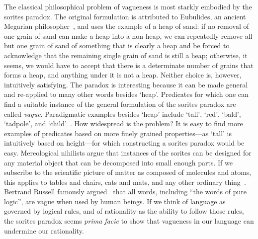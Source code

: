 \documentclass[a4paper]{article}
\begin{document}
The classical philosophical problem of vagueness is most starkly embodied by the sorites paradox.
The original formulation is attributed to Eubulides, an ancient Megarian philosopher~\parencite{sorensen_sorites_2009}, and uses the example of a heap of sand: if no removal of one grain of sand can make a heap into a non-heap, we can repeatedly remove all but one grain of sand of something that is clearly a heap and be forced to acknowledge that the remaining single grain of sand is still a heap; otherwise, it seems, we would have to accept that there is a determinate number of grains that forms a heap, and anything under it is not a heap.
Neither choice is, however, intuitively satisfying.
The paradox is interesting because it can be made general and re-applied to many other words besides `heap'.
Predicates for which one can find a suitable instance of the general formulation of the sorites paradox are called \emph{vague}.
Paradigmatic examples besides `heap' include `tall', `red', `bald', `tadpole', and `child'~\parencite{Keefe1997}.
How widespread is the problem?
It is easy to find more examples of predicates based on more finely grained properties---as `tall' is intuitively based on height---for which constructing a sorites paradox would be easy.
Mereological nihilists argue that instances of the sorites can be designed for any material object that can be decomposed into small enough parts.
If we subscribe to the scientific picture of matter as composed of molecules and atoms, this applies to tables and chairs, cats and mats, and any other ordinary thing~\parencite{Unger1979}.
Bertrand Russell famously argued~\parencite*{russell_vagueness_1923} that all words, including ``the words of pure logic'', are vague when used by human beings.
If we think of language as governed by logical rules, and of rationality as the ability to follow those rules, the sorites paradox seems \emph{prima facie} to show that vagueness in our language can undermine our rationality.
\end{document}
